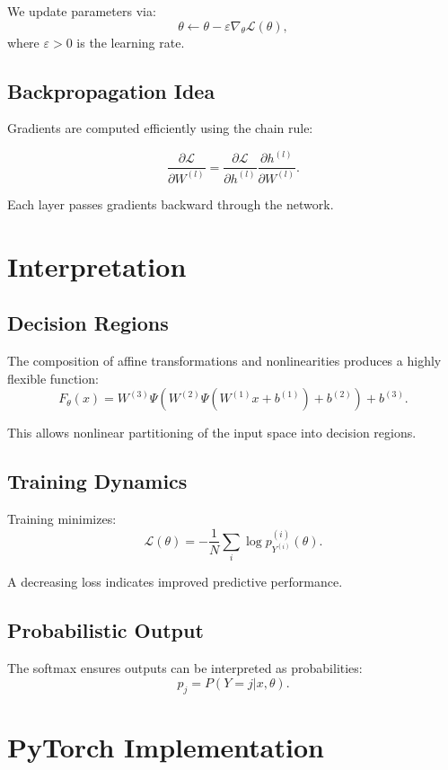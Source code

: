 \documentclass[12pt,oneside]{book}
\numberwithin{equation}{section}
\theoremstyle{definition}
\theoremstyle{plain}
\theoremstyle{remark}
\begin{document}
We update parameters via:
\[
\theta \leftarrow \theta - \varepsilon \nabla_\theta \mathcal{L}(\theta),
\]
where $\varepsilon > 0$ is the learning rate.

\subsection{Backpropagation Idea}

Gradients are computed efficiently using the chain rule:

\[
\frac{\partial \mathcal{L}}{\partial W^{(l)}} 
= \frac{\partial \mathcal{L}}{\partial h^{(l)}} 
\frac{\partial h^{(l)}}{\partial W^{(l)}}.
\]

Each layer passes gradients backward through the network.

\section{Interpretation}

\subsection{Decision Regions}

The composition of affine transformations and nonlinearities produces a highly flexible function:
\[
F_\theta(x) = W^{(3)} \Psi\!\left(W^{(2)} \Psi(W^{(1)}x + b^{(1)}) + b^{(2)}\right) + b^{(3)}.
\]

This allows nonlinear partitioning of the input space into decision regions.

\subsection{Training Dynamics}

Training minimizes:
\[
\mathcal{L}(\theta) = -\frac{1}{N}\sum_i \log p^{(i)}_{Y^{(i)}}(\theta).
\]

A decreasing loss indicates improved predictive performance.

\subsection{Probabilistic Output}

The softmax ensures outputs can be interpreted as probabilities:
\[
p_j = P(Y=j|x,\theta).
\]

\section{PyTorch Implementation}
\end{document}
